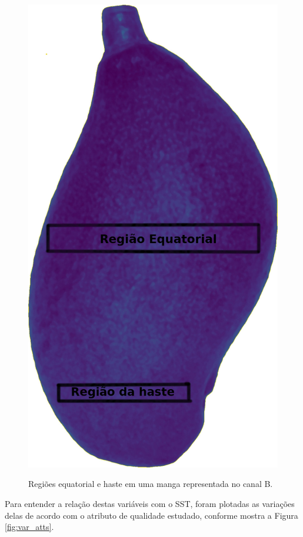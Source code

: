 \begin{figure}[H]
\centering
	\caption{Regiões equatorial e haste em uma manga representada no canal B.}
	\includegraphics[scale=0.2]{img/B_img.jpg}
	\label{fig:equator_stalk_b}
\end{figure}

Para entender a relação destas variáveis com o SST, foram plotadas as variações delas de acordo com o atributo de qualidade estudado, conforme mostra a Figura \ref{fig:var_atts}.

